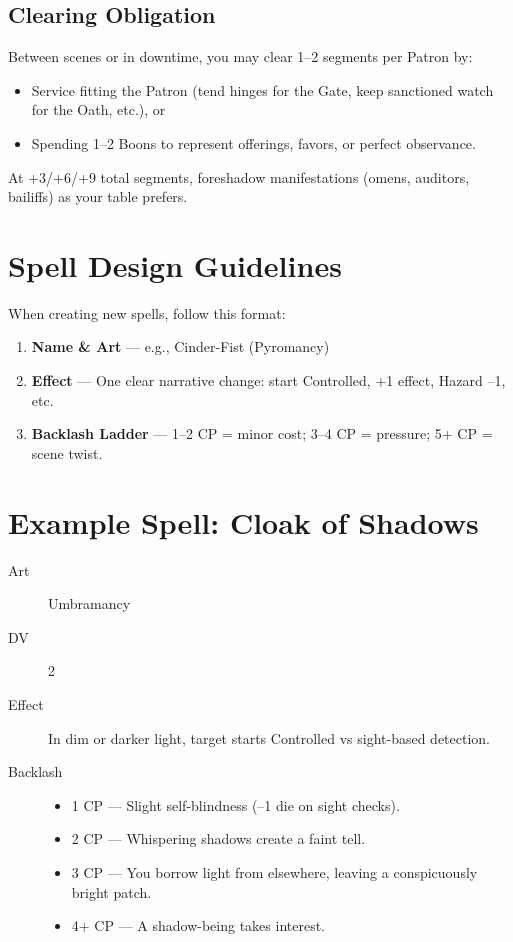 \subsection*{Clearing Obligation}
Between scenes or in downtime, you may clear 1–2 segments per Patron by:
\begin{itemize}
    \item Service fitting the Patron (tend hinges for the Gate, keep sanctioned watch for the Oath, etc.), or
    \item Spending 1–2 Boons to represent offerings, favors, or perfect observance.
\end{itemize}
At +3/+6/+9 total segments, foreshadow manifestations (omens, auditors, bailiffs) as your table prefers.

\section{Spell Design Guidelines}

When creating new spells, follow this format:

\begin{enumerate}
  \item \textbf{Name \& Art} — e.g., Cinder-Fist (Pyromancy)
  \item \textbf{Effect} — One clear narrative change: start Controlled, +1 effect, Hazard –1, etc.
  \item \textbf{Backlash Ladder} — 1–2 CP = minor cost; 3–4 CP = pressure; 5+ CP = scene twist.
\end{enumerate}

\section{Example Spell: Cloak of Shadows}

\begin{description}
  \item[Art] Umbramancy
  \item[DV] 2
  \item[Effect] In dim or darker light, target starts Controlled vs sight-based detection.
  \item[Backlash]
    \begin{itemize}
      \item 1 CP — Slight self-blindness (–1 die on sight checks).
      \item 2 CP — Whispering shadows create a faint tell.
      \item 3 CP — You borrow light from elsewhere, leaving a conspicuously bright patch.
      \item 4+ CP — A shadow-being takes interest.
    \end{itemize}
\end{description}

